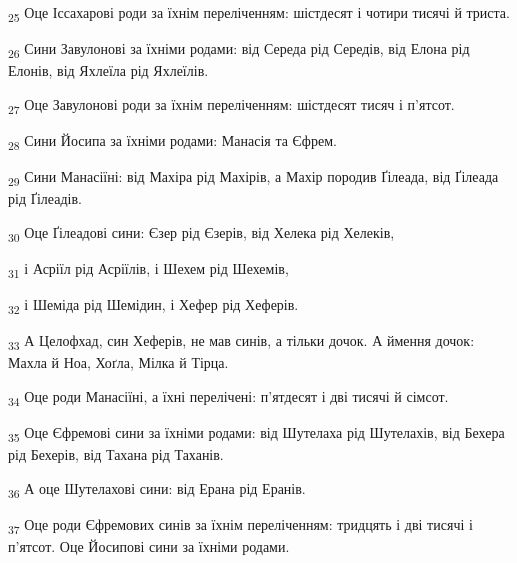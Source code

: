 \begin{tcolorbox}
\textsubscript{25} Оце Іссахарові роди за їхнім переліченням: шістдесят і чотири тисячі й триста.
\end{tcolorbox}
\begin{tcolorbox}
\textsubscript{26} Сини Завулонові за їхніми родами: від Середа рід Середів, від Елона рід Елонів, від Яхлеїла рід Яхлеїлів.
\end{tcolorbox}
\begin{tcolorbox}
\textsubscript{27} Оце Завулонові роди за їхнім переліченням: шістдесят тисяч і п'ятсот.
\end{tcolorbox}
\begin{tcolorbox}
\textsubscript{28} Сини Йосипа за їхніми родами: Манасія та Єфрем.
\end{tcolorbox}
\begin{tcolorbox}
\textsubscript{29} Сини Манасіїні: від Махіра рід Махірів, а Махір породив Ґілеада, від Ґілеада рід Ґілеадів.
\end{tcolorbox}
\begin{tcolorbox}
\textsubscript{30} Оце Ґілеадові сини: Єзер рід Єзерів, від Хелека рід Хелеків,
\end{tcolorbox}
\begin{tcolorbox}
\textsubscript{31} і Асріїл рід Асріїлів, і Шехем рід Шехемів,
\end{tcolorbox}
\begin{tcolorbox}
\textsubscript{32} і Шеміда рід Шемідин, і Хефер рід Хеферів.
\end{tcolorbox}
\begin{tcolorbox}
\textsubscript{33} А Целофхад, син Хеферів, не мав синів, а тільки дочок. А ймення дочок: Махла й Ноа, Хоґла, Мілка й Тірца.
\end{tcolorbox}
\begin{tcolorbox}
\textsubscript{34} Оце роди Манасіїні, а їхні перелічені: п'ятдесят і дві тисячі й сімсот.
\end{tcolorbox}
\begin{tcolorbox}
\textsubscript{35} Оце Єфремові сини за їхніми родами: від Шутелаха рід Шутелахів, від Бехера рід Бехерів, від Тахана рід Таханів.
\end{tcolorbox}
\begin{tcolorbox}
\textsubscript{36} А оце Шутелахові сини: від Ерана рід Еранів.
\end{tcolorbox}
\begin{tcolorbox}
\textsubscript{37} Оце роди Єфремових синів за їхнім переліченням: тридцять і дві тисячі і п'ятсот. Оце Йосипові сини за їхніми родами.
\end{tcolorbox}
